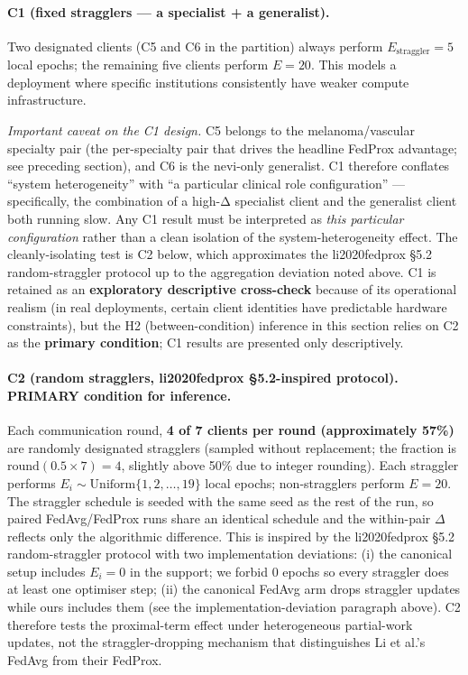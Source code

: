 \documentclass[11pt,a4paper]{article}
\providecommand{\citet}[1]{#1}
\begin{document}
\paragraph{C1 (fixed stragglers --- a specialist + a generalist).} Two
designated clients (C5 and C6 in the partition) always perform
$E_\text{straggler} = 5$ local epochs; the remaining five clients perform
$E = 20$. This models a deployment where specific institutions
consistently have weaker compute infrastructure.

\emph{Important caveat on the C1 design.} C5 belongs to the
melanoma/vascular specialty pair (the per-specialty pair that drives the
headline FedProx advantage; see preceding section), and C6 is the
nevi-only generalist. C1 therefore conflates ``system heterogeneity'' with
``a particular clinical role configuration'' --- specifically, the
combination of a high-Δ specialist client and the generalist client both
running slow. Any C1 result must be interpreted as \emph{this particular
configuration} rather than a clean isolation of the system-heterogeneity
effect. The cleanly-isolating test is C2 below, which approximates
the \citet{li2020fedprox} §5.2 random-straggler protocol up to the
aggregation deviation noted above. C1 is retained as an
\textbf{exploratory descriptive cross-check} because of its
operational realism (in real deployments, certain client identities
have predictable hardware constraints), but the H2 (between-condition)
inference in this section relies on C2 as the \textbf{primary
condition}; C1 results are presented only descriptively.

\paragraph{C2 (random stragglers, \citet{li2020fedprox} §5.2-inspired
protocol). PRIMARY condition for inference.} Each communication round,
\textbf{4 of 7 clients per round (approximately 57\%)} are randomly
designated stragglers (sampled without replacement; the fraction is
$\mathrm{round}(0.5 \times 7) = 4$, slightly above 50\% due to integer
rounding). Each straggler performs $E_i \sim
\text{Uniform}\{1, 2, \ldots, 19\}$ local epochs; non-stragglers perform
$E = 20$. The straggler schedule is seeded with the same seed as the
rest of the run, so paired FedAvg/FedProx runs share an identical
schedule and the within-pair $\Delta$ reflects only the algorithmic
difference. This is inspired by the \citet{li2020fedprox} §5.2
random-straggler protocol with two implementation deviations: (i) the
canonical setup includes $E_i = 0$ in the support; we forbid 0 epochs
so every straggler does at least one optimiser step; (ii) the canonical
FedAvg arm drops straggler updates while ours includes them (see the
implementation-deviation paragraph above). C2 therefore tests the
proximal-term effect under heterogeneous partial-work updates, not the
straggler-dropping mechanism that distinguishes Li et al.'s FedAvg
from their FedProx.
\end{document}
